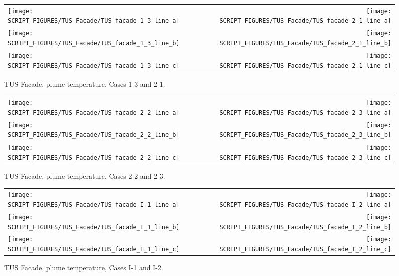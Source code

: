\begin{figure}[p]
\begin{tabular*}{\textwidth}{l@{\extracolsep{\fill}}r}
\texttt{[image: SCRIPT\_FIGURES/TUS\_Facade/TUS\_facade\_1\_3\_line\_a]} &
\texttt{[image: SCRIPT\_FIGURES/TUS\_Facade/TUS\_facade\_2\_1\_line\_a]} \\
\texttt{[image: SCRIPT\_FIGURES/TUS\_Facade/TUS\_facade\_1\_3\_line\_b]} &
\texttt{[image: SCRIPT\_FIGURES/TUS\_Facade/TUS\_facade\_2\_1\_line\_b]} \\
\texttt{[image: SCRIPT\_FIGURES/TUS\_Facade/TUS\_facade\_1\_3\_line\_c]} &
\texttt{[image: SCRIPT\_FIGURES/TUS\_Facade/TUS\_facade\_2\_1\_line\_c]}
\end{tabular*}
\caption[TUS Facade, plume temperature, Cases 1-3 and 2-1]{TUS Facade, plume temperature, Cases 1-3 and 2-1.}
\label{TUS Facade_Plume_Temp_2}
\end{figure}

\begin{figure}[p]
\begin{tabular*}{\textwidth}{l@{\extracolsep{\fill}}r}
\texttt{[image: SCRIPT\_FIGURES/TUS\_Facade/TUS\_facade\_2\_2\_line\_a]} &
\texttt{[image: SCRIPT\_FIGURES/TUS\_Facade/TUS\_facade\_2\_3\_line\_a]} \\
\texttt{[image: SCRIPT\_FIGURES/TUS\_Facade/TUS\_facade\_2\_2\_line\_b]} &
\texttt{[image: SCRIPT\_FIGURES/TUS\_Facade/TUS\_facade\_2\_3\_line\_b]} \\
\texttt{[image: SCRIPT\_FIGURES/TUS\_Facade/TUS\_facade\_2\_2\_line\_c]} &
\texttt{[image: SCRIPT\_FIGURES/TUS\_Facade/TUS\_facade\_2\_3\_line\_c]}
\end{tabular*}
\caption[TUS Facade, plume temperature, Cases 2-2 and 2-3]{TUS Facade, plume temperature, Cases 2-2 and 2-3.}
\label{TUS Facade_Plume_Temp_3}
\end{figure}

\begin{figure}[p]
\begin{tabular*}{\textwidth}{l@{\extracolsep{\fill}}r}
\texttt{[image: SCRIPT\_FIGURES/TUS\_Facade/TUS\_facade\_I\_1\_line\_a]} &
\texttt{[image: SCRIPT\_FIGURES/TUS\_Facade/TUS\_facade\_I\_2\_line\_a]} \\
\texttt{[image: SCRIPT\_FIGURES/TUS\_Facade/TUS\_facade\_I\_1\_line\_b]} &
\texttt{[image: SCRIPT\_FIGURES/TUS\_Facade/TUS\_facade\_I\_2\_line\_b]} \\
\texttt{[image: SCRIPT\_FIGURES/TUS\_Facade/TUS\_facade\_I\_1\_line\_c]} &
\texttt{[image: SCRIPT\_FIGURES/TUS\_Facade/TUS\_facade\_I\_2\_line\_c]}
\end{tabular*}
\caption[TUS Facade, plume temperature, Cases I-1 and I-2]{TUS Facade, plume temperature, Cases I-1 and I-2.}
\label{TUS Facade_Plume_Temp_4}
\end{figure}

